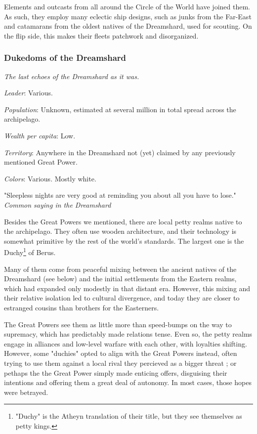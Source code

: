 Elements and outcasts from all around the Circle of the World have joined them. As such, they employ many eclectic ship designs, such as junks from the Far-East and catamarans from the oldest natives of the Dreamshard, used for scouting. On the flip side, this makes their fleets patchwork and disorganized.  

\subsubsection{Dukedoms of the Dreamshard}

\textit{The last echoes of the Dreamshard as it was.}

\textit{Leader}: Various.

\textit{Population}: Unknown, estimated at several million in total spread across the archipelago.

\textit{Wealth per capita}: Low.

\textit{Territory}: Anywhere in the Dreamshard not (yet) claimed by any previously mentioned Great Power.
    
\textit{Colors}: Various. Mostly white.

\begin{rpg-quotebox}
    "Sleepless nights are very good at reminding you about all you have to lose." \\ \textendash \textit{Common saying in the Dreamshard}
\end{rpg-quotebox}

Besides the Great Powers we mentioned, there are local petty realms native to the archipelago. They often use wooden architecture, and their technology is somewhat primitive by the rest of the world's standards. The largest one is the Duchy\footnote{"Duchy" is the Atheyn translation of their title, but they see themselves as petty kings.} of Berus.

Many of them come from peaceful mixing between the ancient natives of the Dreamshard (see below) and the initial settlements from the Eastern realms, which had expanded only modestly in that distant era. However, this mixing and their relative isolation led to cultural divergence, and today they are closer to estranged cousins than brothers for the Easterners.

The Great Powers see them as little more than speed-bumps on the way to supremacy, which has predictably made relations tense. Even so, the petty realms engage in alliances and low-level warfare with each other, with loyalties shifting. However, some "duchies" opted to align with the Great Powers instead, often trying to use them against a local rival they percieved as a bigger threat ; or pethaps the the Great Power simply made enticing offers, disguising their intentions and offering them a great deal of autonomy. In most cases, those hopes were betrayed.

